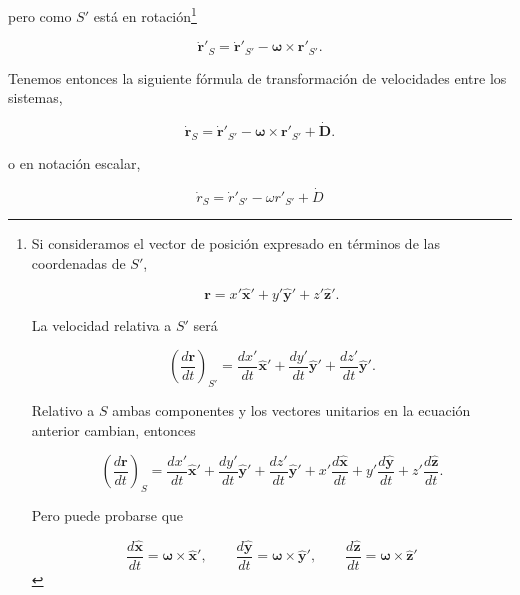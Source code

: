 \documentclass[a4paper,10pt]{article}
\numberwithin{equation}{section}
\begin{document}
pero como $S'$ está en rotación\footnote{Si consideramos el vector de posición expresado en términos de 
las coordenadas de $S'$, 

\begin{equation*}
 \mathbf{r} = x'\mathbf{\hat{x}'} + y'\mathbf{\hat{y}'} + z'\mathbf{\hat{z}'}.
\end{equation*}

La velocidad relativa a $S'$ será 

\begin{equation*}
 \left( \frac{d\mathbf{r}}{dt} \right)_{S'} = \frac{dx'}{dt}\mathbf{\hat{x}'} 
 + \frac{dy'}{dt}\mathbf{\hat{y}'} + \frac{dz'}{dt}\mathbf{\hat{y}'}.
\end{equation*}

Relativo a $S$ ambas componentes y los vectores unitarios en la ecuación anterior 
cambian, entonces

\begin{equation*}
 \left( \frac{d\mathbf{r}}{dt} \right)_{S} = \frac{dx'}{dt}\mathbf{\hat{x}'} 
 + \frac{dy'}{dt}\mathbf{\hat{y}'} + \frac{dz'}{dt}\mathbf{\hat{y}'} + 
 x'\frac{d\mathbf{\hat{x}}}{dt} + y'\frac{d\mathbf{\hat{y}}}{dt} + z'\frac{d\mathbf{\hat{z}}}{dt}.
\end{equation*}

Pero puede probarse que \cite{delange}

\begin{equation*}
 \frac{d\mathbf{\hat{x}}}{dt} = \mathbf{\omega} \times \mathbf{\hat{x}}', \qquad 
 \frac{d\mathbf{\hat{y}}}{dt} = \mathbf{\omega} \times \mathbf{\hat{y}}', \qquad 
 \frac{d\mathbf{\hat{z}}}{dt} = \mathbf{\omega} \times \mathbf{\hat{z}}'
\end{equation*}}

\begin{equation}
 \mathbf{\dot{r}}'_S = \mathbf{\dot{r}}{'}_{S'} - \mathbf{\omega} \times \mathbf{r}'_{S'}.
\end{equation}

Tenemos entonces la siguiente fórmula de transformación de velocidades entre 
los sistemas,

\begin{equation}
 \mathbf{\dot{r}}_S = \mathbf{\dot{r}}'_{S'} - \mathbf{\omega} \times \mathbf{r}'_{S'} + \mathbf{\dot{D}}.
\end{equation}

o en notación escalar,

\begin{equation}
 \dot{r}_S  = \dot{r}'_{S'} - \omega r'_{S'} + \dot{D}
\end{equation}
\end{document}
